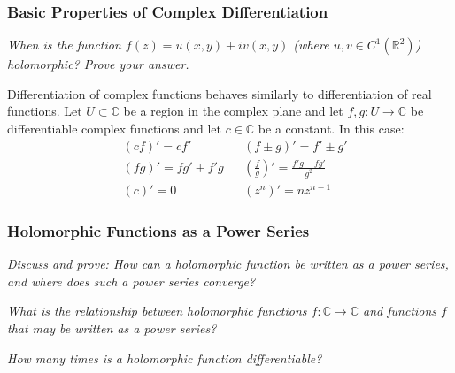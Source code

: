 \documentclass[11pt, a4paper]{article}
\newcommand{\question}[1]{\textit{#1}\vspace{2mm}}
\newcommand{\R}{\mathbb{R}} %
\newcommand{\C}{\mathbb{C}} %
\begin{document}
\subsubsection{Basic Properties of Complex Differentiation}
\question{When is the function $ f(z) = u(x, y) + iv(x, y) $ (where $ u, v \in C^{1}(\R^2)$) holomorphic? Prove your answer. }

Differentiation of complex functions behaves similarly to differentiation of real functions. Let $ U \subset \C $ be a region in the complex plane and let $ f, g : U \to \C $ be differentiable complex functions and let $ c \in \C $ be a constant. In this case:
\begin{align*}
	&(cf)' = cf' && (f \pm g)' = f' \pm g'\\
	&(fg)' = fg' + f'g && \left(\frac{f}{g}\right)'= \frac{f'g - fg'}{g^2}\\
	&(c)' = 0 & &\left(z^n\right)'= n z^{n-1}
\end{align*}

\subsubsection{Holomorphic Functions as a Power Series}
\question{Discuss and prove: How can a holomorphic function be written as a power series, and where does such a power series converge?}
	
\textit{What is the relationship between holomorphic functions $ f:\C \to \C $ and functions $ f $ that may be written as a power series?}
	
	\textit{How many times is a holomorphic function differentiable?} 
\end{document}
